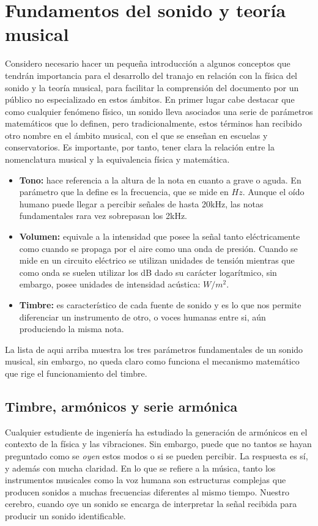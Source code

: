 \section{Fundamentos del sonido y teoría musical}
Considero necesario hacer un pequeña introducción a algunos conceptos que tendrán importancia para el desarrollo del tranajo en relación con la física del sonido y la teoría musical, para facilitar la comprensión del documento por un público no especializado en estos ámbitos. 
En primer lugar cabe destacar que como cualquier fenómeno físico, un sonido lleva asociados una serie de parámetros matemáticos que lo definen, pero tradicionalmente, estos términos han recibido otro nombre en el ámbito musical, con el que se enseñan en escuelas y conservatorios. Es importante, por tanto, tener clara la relación entre la nomenclatura musical y la equivalencia física y matemática.
\begin{itemize}
\item \textbf{Tono:} hace referencia a la altura de la nota en cuanto a grave o aguda. En parámetro que la define es la frecuencia, que se mide en $Hz$. Aunque el oído humano puede llegar a percibir señales de hasta 20kHz, las notas fundamentales rara vez sobrepasan los 2kHz.
\item \textbf{Volumen:} equivale a la intensidad que posee la señal tanto eléctricamente como cuando se propaga por el aire como una onda de presión. Cuando se mide en un circuito eléctrico se utilizan unidades de tensión mientras que como onda se suelen utilizar los dB dado su carácter logarítmico, sin embargo, posee unidades de intensidad acústica: $W/m^{2}$.
\item\textbf{Timbre:} es característico de cada fuente de sonido y es lo que nos permite diferenciar un instrumento de otro, o voces humanas entre si, aún produciendo la misma nota.
\end{itemize}

La lista de aqui arriba muestra los tres parámetros fundamentales de un sonido musical, sin embargo, no queda claro como funciona el mecanismo matemático que rige el funcionamiento del timbre.

\subsection{Timbre, armónicos y serie armónica}
Cualquier estudiente de ingeniería ha estudiado la generación de armónicos en el contexto de la física y las vibraciones. Sin embargo, puede que no tantos se hayan preguntado como se \emph{oyen} estos modos o si se pueden percibir. La respuesta es sí, y además con mucha claridad. En lo que se refiere a la música, tanto los instrumentos musicales como la voz humana son estructuras complejas que producen sonidos a muchas frecuencias diferentes al mismo tiempo. Nuestro cerebro, cuando oye un sonido se encarga de interpretar la señal recibida para producir un sonido identificable. 


